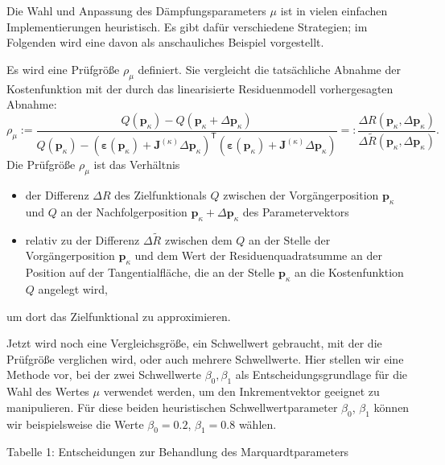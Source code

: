 Die Wahl und Anpassung des Dämpfungsparameters $\mu$ ist in vielen einfachen
Implementierungen heuristisch. Es gibt dafür verschiedene Strategien; im Folgenden
wird eine davon als anschauliches Beispiel vorgestellt.

Es wird eine Prüfgröße $\rho_{\mu}$ definiert. Sie vergleicht die tatsächliche
Abnahme der Kostenfunktion mit der durch das linearisierte Residuenmodell
vorhergesagten Abnahme:
\begin{equation}
\rho_{\mu} :=\frac{Q(\mathbf{p}_\kappa) -
Q(\mathbf{p}_\kappa + \Delta \mathbf{p}_\kappa)}
{Q(\mathbf{p}_\kappa) -
\left( \boldsymbol \varepsilon (\mathbf{p}_\kappa)
    + \mathbf{J}^{(\kappa)} \Delta \mathbf{p}_\kappa \right)^\mathsf{T}
\left( \boldsymbol \varepsilon (\mathbf{p}_\kappa)
    + \mathbf{J}^{(\kappa)} \Delta \mathbf{p}_\kappa \right)  }
=:  \frac{\Delta R(\mathbf{p}_\kappa, \Delta \mathbf{p}_\kappa)}{\Delta \tilde{R}(\mathbf{p}_\kappa, \Delta \mathbf{p}_\kappa)} .
\label{DaempfTuning}
\end{equation}
Die Prüfgröße $\rho_{\mu}$ ist das Verhältnis
\begin{itemize}
\item der Differenz $\Delta R$ des Zielfunktionals $Q$ zwischen
der Vorgängerposition $\mathbf{p}_\kappa$ und $Q$ an der Nachfolgerposition
$\mathbf{p}_\kappa + \Delta \mathbf{p}_\kappa$
des Parametervektors
\item relativ zu der Differenz $\Delta \tilde{R}$ zwischen dem $Q$ an der
Stelle der Vorgängerposition $\mathbf{p}_\kappa$ und dem Wert der Residuenquadratsumme
an der Position auf der Tangentialfläche, die an der
Stelle $\mathbf{p}_\kappa$ an die Kostenfunktion $Q$ angelegt wird,
\end{itemize}
um dort das Zielfunktional zu approximieren.

Jetzt wird noch eine Vergleichsgröße, ein Schwellwert gebraucht, mit der die
Prüfgröße verglichen wird, oder auch mehrere Schwellwerte. Hier stellen wir
eine Methode vor, bei der zwei Schwellwerte $\beta_0, \beta_1$ als
Ent\-scheid\-ungs\-grund\-lage für die Wahl des
Wertes $\mu$ verwendet werden, um den Inkrementvektor geeignet zu manipulieren.
Für diese beiden heuristischen Schwell\-wert\-para\-meter $\beta_0$, $\beta_1$
können wir beispielsweise die Werte $\beta_0 = 0.2$, $\beta_1 = 0.8$ wählen.

Tabelle 1: Entscheidungen zur Behandlung des Marquardtparameters

